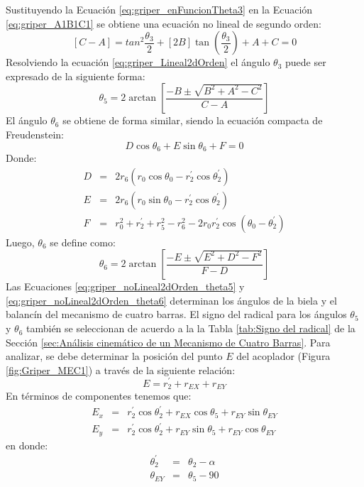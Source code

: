 Sustituyendo la Ecuación \ref{eq:griper_enFuncionTheta3} en la Ecuación \ref{eq:griper_A1B1C1} se obtiene una ecuación no lineal de segundo orden:
\begin{equation} \label{eq:griper_Lineal2dOrden}
 \left[C-A\right]= tan^2{\frac{\theta_3}{2}}+\left[2B\right]\tan{(\frac{\theta_3}{2})}+A+C=0
\end{equation}
Resolviendo la ecuación \ref{eq:griper_Lineal2dOrden} el ángulo $\theta_3$ puede ser expresado de la siguiente forma:
\begin{equation} \label{eq:griper_noLineal2dOrden_theta5}
\theta_5= 2\arctan \left[ \frac{-B \pm \sqrt{B^2+A^2-C^2}}{C-A} \right]
\end{equation}
El ángulo $\theta_6$ se obtiene de forma similar, siendo la ecuación compacta de Freudenstein:
\begin{equation} \label{eq:griper_A1B1C1_2}
 D\cos{\theta_6}+E\sin{\theta_6}+F=0 
\end{equation}
Donde:
\begin{eqnarray}
D&=& 2r_6(r_0\cos{\theta_0}-r^{\prime}_2\cos{\theta^{\prime}_2}) \label{eq:griper_A_2} \\
E&=& 2r_6(r_0\sin{\theta_0}-r^{\prime}_2\cos{\theta^{\prime}_2}) \label{eq:griper_B_2} \\
F&=& r_0^2+r^{\prime}_2+r_5^2-r_6^2 -2r_0r^{\prime}_2\cos(\theta_0-\theta^{\prime}_2) \label{eq:griper_C_2}
\end{eqnarray}
Luego, $\theta_6$ se define como:
\begin{equation} \label{eq:griper_noLineal2dOrden_theta6}
\theta_6= 2\arctan \left[ \frac{-E \pm \sqrt{E^2+D^2-F^2}}{F-D} \right]
\end{equation}
Las Ecuaciones \ref{eq:griper_noLineal2dOrden_theta5} y \ref{eq:griper_noLineal2dOrden_theta6} determinan los ángulos de la biela y el balancín del mecanismo de cuatro barras. El signo del radical para los ángulos $\theta_5$ y $\theta_6$ también se seleccionan de acuerdo a la la Tabla \ref{tab:Signo del radical} de la Sección \ref{sec:Análisis cinemático de un Mecanismo de Cuatro Barras}. Para analizar, se debe determinar la posición del punto $E$ del acoplador (Figura \ref{fig:Griper_MEC1}) a través de la siguiente relación:
\begin{equation} \label{eq:griper_E}
E=r^{\prime}_2+ r_{EX}+r_{EY}
\end{equation}
En términos de componentes tenemos que:
\begin{eqnarray}
E_{x}&=&r^{\prime}_2\cos{\theta^{\prime}_2} +r_{EX}\cos{\theta_5}+r_{EY}\sin{\theta_{EY}} \label{eq:gripper_Cxr} \\
E_{y}&=&r^{\prime}_2\cos{\theta^{\prime}_2} +r_{EY}\sin{\theta_5}+r_{EY}\cos{\theta_{EY}}\label{eq:gripper_Cyr}
\end{eqnarray}
en donde:
\begin{eqnarray}
\theta^{\prime}_{2} &=& \theta_2-\alpha \\
\theta_{EY} &=& \theta_5-90
\end{eqnarray}


